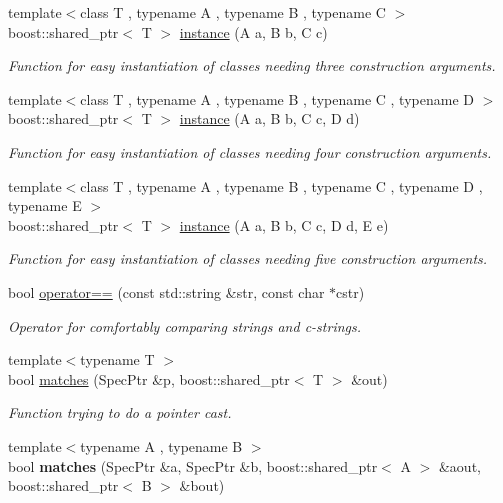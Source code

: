 \begin{DoxyCompactItemize}
{\footnotesize template$<$class T , typename A , typename B , typename C $>$ }\\boost\-::shared\-\_\-ptr$<$ T $>$ \hyperlink{namespacegiskard__suturo_a2ee8de6a2c6e4004cde1a9b9523e4780}{instance} (A a, B b, C c)
\begin{DoxyCompactList}\small\item\em Function for easy instantiation of classes needing three construction arguments. \end{DoxyCompactList}\item 
{\footnotesize template$<$class T , typename A , typename B , typename C , typename D $>$ }\\boost\-::shared\-\_\-ptr$<$ T $>$ \hyperlink{namespacegiskard__suturo_a237303e76508b0b4c3d96fb8d7a7c0ab}{instance} (A a, B b, C c, D d)
\begin{DoxyCompactList}\small\item\em Function for easy instantiation of classes needing four construction arguments. \end{DoxyCompactList}\item 
{\footnotesize template$<$class T , typename A , typename B , typename C , typename D , typename E $>$ }\\boost\-::shared\-\_\-ptr$<$ T $>$ \hyperlink{namespacegiskard__suturo_a5c4b75c034dcbe0374c1695acb260577}{instance} (A a, B b, C c, D d, E e)
\begin{DoxyCompactList}\small\item\em Function for easy instantiation of classes needing five construction arguments. \end{DoxyCompactList}\item 
bool \hyperlink{namespacegiskard__suturo_aff0bb17b344db3fa347f454cf0066a5b}{operator==} (const std\-::string \&str, const char $\ast$cstr)
\begin{DoxyCompactList}\small\item\em Operator for comfortably comparing strings and c-\/strings. \end{DoxyCompactList}\item 
{\footnotesize template$<$typename T $>$ }\\bool \hyperlink{namespacegiskard__suturo_a84de38bf181efa1e91dfa0caef73dd88}{matches} (Spec\-Ptr \&p, boost\-::shared\-\_\-ptr$<$ T $>$ \&out)
\begin{DoxyCompactList}\small\item\em Function trying to do a pointer cast. \end{DoxyCompactList}\item 
\hypertarget{namespacegiskard__suturo_a9415e18fa78b9ec3db39c0dd140dbbd8}{{\footnotesize template$<$typename A , typename B $>$ }\\bool {\bfseries matches} (Spec\-Ptr \&a, Spec\-Ptr \&b, boost\-::shared\-\_\-ptr$<$ A $>$ \&aout, boost\-::shared\-\_\-ptr$<$ B $>$ \&bout)}\label{namespacegiskard__suturo_a9415e18fa78b9ec3db39c0dd140dbbd8}


\end{DoxyCompactItemize}
